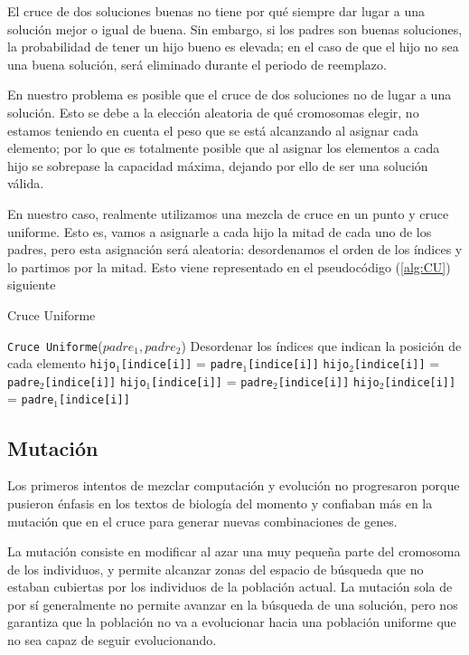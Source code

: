 El cruce de dos soluciones buenas no tiene por qué siempre dar lugar a una solución mejor o igual de buena. 
Sin embargo, si los padres son buenas soluciones, la probabilidad de tener un hijo bueno es elevada; en el caso de que el hijo no sea una buena solución, será eliminado durante el periodo de reemplazo. 

En nuestro problema es posible que el cruce de dos soluciones no de lugar a una solución. 
Esto se debe a la elección aleatoria de qué cromosomas elegir, no estamos teniendo en cuenta el peso que se está alcanzando al asignar cada elemento; por lo que es totalmente posible que  al asignar los elementos a cada hijo se sobrepase la capacidad máxima, dejando por ello de ser una solución válida. 


En nuestro caso, realmente utilizamos una mezcla de cruce en un punto y cruce uniforme. 
Esto es, vamos a asignarle a cada hijo la mitad de cada uno de los padres, pero esta asignación será aleatoria: desordenamos el orden de los índices y lo partimos por la mitad. 
Esto viene representado en el pseudocódigo (\ref{alg:CU}) siguiente

\begin{algorithm}[H]
\caption{Cruce Uniforme}\label{alg:CU}
\begin{algorithmic}[1]
\Procedure \texttt{Cruce Uniforme}($padre_1, padre_2$)
\State Desordenar los índices que indican la posición de cada elemento
		\State \texttt{hijo$_1$[indice[i]]} = \texttt{padre$_1$[indice[i]]}
		\State \texttt{hijo$_2$[indice[i]]} = \texttt{padre$_2$[indice[i]]}
	\Else
		\State \texttt{hijo$_1$[indice[i]]} = \texttt{padre$_2$[indice[i]]}
		\State \texttt{hijo$_2$[indice[i]]} = \texttt{padre$_1$[indice[i]]}
	\EndIf
\EndFor
\EndProcedure
\end{algorithmic}
\end{algorithm}

\subsection{Mutación}

Los primeros intentos de mezclar computación y evolución no progresaron porque pusieron énfasis en los textos de biología del momento y confiaban más en la mutación que en el cruce para generar nuevas combinaciones de genes. 

La mutación consiste en modificar al azar una muy pequeña parte del cromosoma de los individuos, y permite alcanzar zonas del espacio de búsqueda que no estaban cubiertas por los individuos de la población actual. 
La mutación sola de por sí generalmente no permite avanzar en la búsqueda de una solución, pero nos garantiza que la población no va a evolucionar hacia una población uniforme que no sea capaz de seguir evolucionando. 

